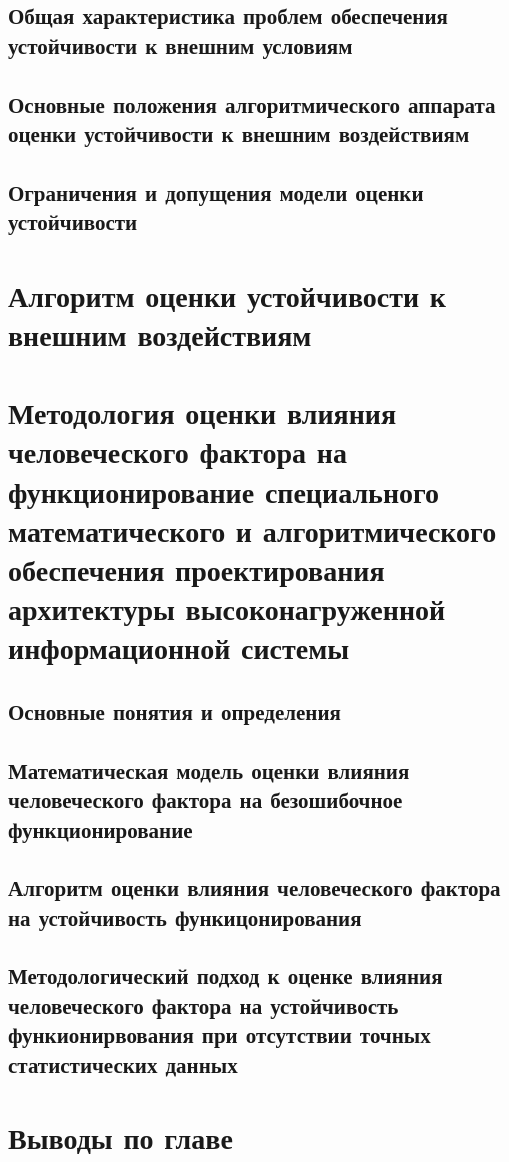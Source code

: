\subsection{Общая характеристика проблем обеспечения устойчивости к внешним условиям}\label{subsec:ch6/sect2/sub1}
\subsection{Основные положения алгоритмического аппарата оценки устойчивости к внешним воздействиям}\label{subsec:ch6/sect2/sub2}
\subsection{Ограничения и допущения модели оценки устойчивости}\label{subsec:ch6/sect2/sub3}

\section{Алгоритм оценки устойчивости к внешним воздействиям}\label{sec:ch6/sect3}
\section{Методология оценки влияния человеческого фактора на функционирование специального математического и алгоритмического обеспечения проектирования архитектуры высоконагруженной информационной системы}\label{sec:ch6/sect4}
\subsection{Основные понятия и определения}\label{subsec:ch6/sect4/sub1}
\subsection{Математическая модель оценки влияния человеческого фактора на безошибочное функционирование}\label{subsec:ch6/sect4/sub1}
\subsection{Алгоритм оценки влияния человеческого фактора на устойчивость функицонирования}\label{subsec:ch6/sect4/sub1}
\subsection{Методологический подход к оценке влияния человеческого фактора на устойчивость функионирвования при отсутствии точных статистических данных}\label{subsec:ch6/sect4/sub1}
\section{Выводы по главе}\label{sec:ch6/sect3}


\clearpage
